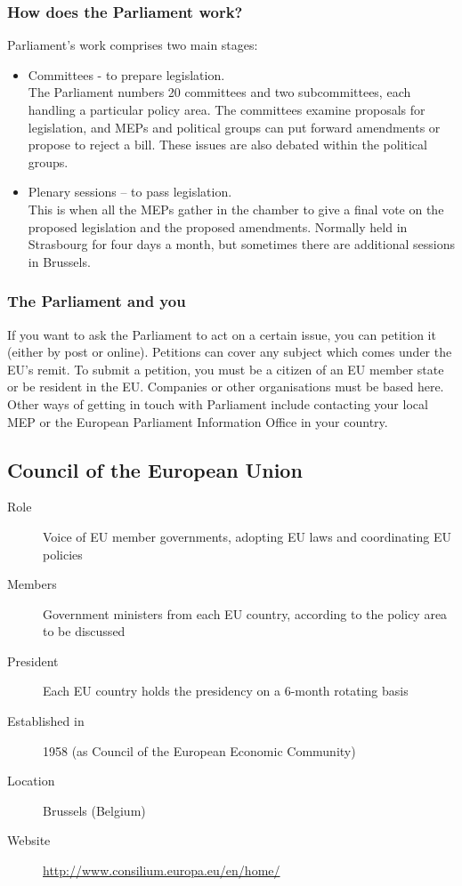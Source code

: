 \subsubsection{How does the Parliament work?}

Parliament's work comprises two main stages:
\begin{itemize}
	\item Committees - to prepare legislation. \\
	The Parliament numbers 20 committees and two subcommittees, each handling a particular policy area. The committees examine proposals for legislation, and MEPs and political groups can put forward amendments or propose to reject a bill. These issues are also debated within the political groups.
	\item Plenary sessions – to pass legislation. \\
	This is when all the MEPs gather in the chamber to give a final vote on the proposed legislation and the proposed amendments. Normally held in Strasbourg for four days a month, but sometimes there are additional sessions in Brussels.
\end{itemize}


\subsubsection{The Parliament and you}
If you want to ask the Parliament to act on a certain issue, you can petition it (either by post or online).
Petitions can cover any subject which comes under the EU's remit.
To submit a petition, you must be a citizen of an EU member state or be resident in the EU. Companies or other organisations must be based here.
Other ways of getting in touch with Parliament include contacting your local MEP or the European Parliament Information Office in your country.


\subsection{Council of the European Union}
\begin{description}
	\item[Role] Voice of EU member governments, adopting EU laws and coordinating EU policies
	\item[Members] Government ministers from each EU country, according to the policy area to be discussed
	\item[President] Each EU country holds the presidency on a 6-month rotating basis
	\item[Established in] 1958 (as Council of the European Economic Community)
	\item[Location] Brussels (Belgium)
	\item[Website] \href{http://www.consilium.europa.eu/en/home/}{http://www.consilium.europa.eu/en/home/}
\end{description}


